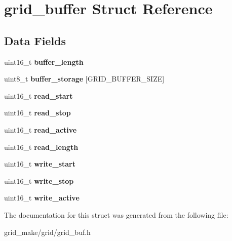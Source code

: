 \hypertarget{structgrid__buffer}{\section{grid\-\_\-buffer Struct Reference}
\label{structgrid__buffer}
}
\subsection*{Data Fields}
\begin{DoxyCompactItemize}
\item 
\hypertarget{structgrid__buffer_a16fdbf95bd90742384bb1d666e59b2e4}{uint16\-\_\-t {\bfseries buffer\-\_\-length}}\label{structgrid__buffer_a16fdbf95bd90742384bb1d666e59b2e4}

\item 
\hypertarget{structgrid__buffer_a4e73c0dab57747f2c0d9a609dc165d23}{uint8\-\_\-t {\bfseries buffer\-\_\-storage} \mbox{[}G\-R\-I\-D\-\_\-\-B\-U\-F\-F\-E\-R\-\_\-\-S\-I\-Z\-E\mbox{]}}\label{structgrid__buffer_a4e73c0dab57747f2c0d9a609dc165d23}

\item 
\hypertarget{structgrid__buffer_a12952dba43421fa854c37271e0381301}{uint16\-\_\-t {\bfseries read\-\_\-start}}\label{structgrid__buffer_a12952dba43421fa854c37271e0381301}

\item 
\hypertarget{structgrid__buffer_aa7e8b27d9b08408aef1a7581e3e78e6e}{uint16\-\_\-t {\bfseries read\-\_\-stop}}\label{structgrid__buffer_aa7e8b27d9b08408aef1a7581e3e78e6e}

\item 
\hypertarget{structgrid__buffer_a039769caedd4ce783fdf23851b2d20a0}{uint16\-\_\-t {\bfseries read\-\_\-active}}\label{structgrid__buffer_a039769caedd4ce783fdf23851b2d20a0}

\item 
\hypertarget{structgrid__buffer_a58f6c2defb1db4d5002710588959c859}{uint16\-\_\-t {\bfseries read\-\_\-length}}\label{structgrid__buffer_a58f6c2defb1db4d5002710588959c859}

\item 
\hypertarget{structgrid__buffer_ab68669e8e608de6fd94579c36e77c846}{uint16\-\_\-t {\bfseries write\-\_\-start}}\label{structgrid__buffer_ab68669e8e608de6fd94579c36e77c846}

\item 
\hypertarget{structgrid__buffer_a8689dd6ca92e755d8467394cd07f7e63}{uint16\-\_\-t {\bfseries write\-\_\-stop}}\label{structgrid__buffer_a8689dd6ca92e755d8467394cd07f7e63}

\item 
\hypertarget{structgrid__buffer_a7d56d212fbd12ae87c7598b5e5952760}{uint16\-\_\-t {\bfseries write\-\_\-active}}\label{structgrid__buffer_a7d56d212fbd12ae87c7598b5e5952760}

\end{DoxyCompactItemize}


The documentation for this struct was generated from the following file\-:\begin{DoxyCompactItemize}
\item 
grid\-\_\-make/grid/grid\-\_\-buf.\-h\end{DoxyCompactItemize}
